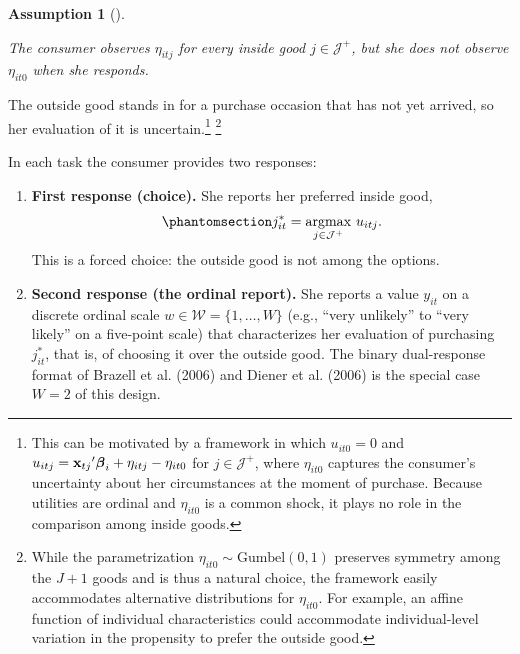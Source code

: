 \documentclass[
  letterpaper,
  DIV=11,
  numbers=noendperiod]{scrartcl}
\theoremstyle{plain}
\theoremstyle{plain}
\theoremstyle{plain}
\newtheorem{conjecture}{Assumption}[section]
\theoremstyle{remark}
\begin{document}
\begin{conjecture}[]\protect\hypertarget{cnj-outside}{}\label{cnj-outside}

The consumer observes \(\eta_{itj}\) for every inside good
\(j \in \mathcal{J}^+\), but she does not observe \(\eta_{it0}\) when
she responds.

\end{conjecture}

The outside good stands in for a purchase occasion that has not yet
arrived, so her evaluation of it is uncertain.\footnote{This can be
  motivated by a framework in which \(u_{it0} = 0\) and
  \(u_{itj} = {\mathbf{x}_{tj}}'\boldsymbol{\beta}_i + \eta_{itj} - \eta_{it0}\) for
  \(j \in \mathcal{J}^{+}\), where \(\eta_{it0}\) captures the
  consumer's uncertainty about her circumstances at the moment of
  purchase. Because utilities are ordinal and \(\eta_{it0}\) is a common
  shock, it plays no role in the comparison among inside goods.}
\footnote{While the parametrization
  \(\eta_{it0} \sim \text{Gumbel}\left(0,1\right)\) preserves symmetry
  among the \(J+1\) goods and is thus a natural choice, the framework
  easily accommodates alternative distributions for \(\eta_{it0}\). For
  example, an affine function of individual characteristics could
  accommodate individual-level variation in the propensity to prefer the
  outside good.}

In each task the consumer provides two responses:

\begin{enumerate}
\def\labelenumi{\arabic{enumi}.}
\item
  \textbf{First response (choice).} She reports her preferred inside
  good, \begin{equation}\protect\phantomsection\label{eq-firstresponse}{
  j^*_{it} = \underset{j \in \mathcal{J}^+}{\operatorname{arg max}} \ u_{itj}.
  }\end{equation} This is a forced choice: the outside good is not among
  the options.
\item
  \textbf{Second response (the ordinal report).} She reports a value
  \(y_{it}\) on a discrete ordinal scale
  \(w \in \mathcal{W} = \lbrace 1, \ldots, W \rbrace\) (e.g., ``very
  unlikely'' to ``very likely'' on a five-point scale) that
  characterizes her evaluation of purchasing \(j^*_{it}\), that is, of
  choosing it over the outside good. The binary dual-response format of
  Brazell et al. (2006) and Diener et al. (2006) is the special case
  \(W=2\) of this design.
\end{enumerate}
\end{document}
